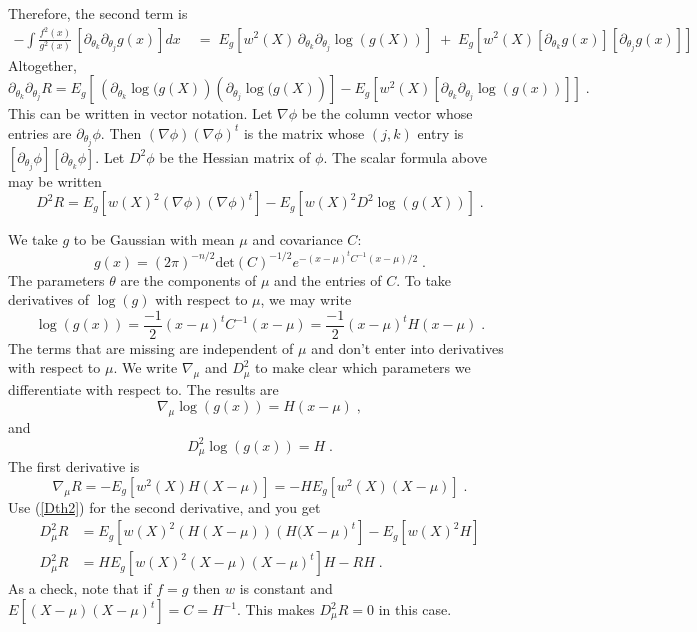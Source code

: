 \documentclass{article}
\begin{document}
Therefore, the second term is
\begin{align*}
    - \int \frac{f^2(x)}{g^2(x)} \,\left[\partial_{\theta_k}\partial_{\theta_j} g(x)\right] dx
  \;&=\;   E_g\!\left[ w^2(X)\, \partial_{\theta_k} \partial_{\theta_j}\log(g(X))\right]
   \; + \; E_g\!\left[ w^2(X)\left[ \partial_{\theta_k} g(x)\right]
                \left[ \partial_{\theta_j} g(x)\right]\right]
\end{align*}
Altogether,
\[
   \partial_{\theta_k} \partial_{\theta_j}R 
           =  E_g\!\left[ \,\left(\partial_{\theta_k} \log( g(X)\right)
                            \left(\partial_{\theta_j} \log( g(X)\right) \right]
            - E_g\!\left[ w^2(X)\left[ \partial_{\theta_k} \partial_{\theta_j}\log(g(x))\right]\right] \; .
\]
This can be written in vector notation.
Let $\nabla \phi$ be the column vector whose entries are $\partial_{\theta_j} \phi$.
Then $\left( \nabla \phi\right) \left( \nabla \phi\right)^t$ is the matrix whose $(j,k)$ entry is
$\left[\partial_{\theta_j}\phi\right] \left[\partial_{\theta_k} \phi\right] $.
Let $D^2 \phi$ be the Hessian matrix of $\phi$.
The scalar formula above may be written
\begin{equation}
D^2 R = E_g\!\left[  w(X)^2\left(\nabla \phi\right)\left( \nabla \phi\right)^t\right]
      - E_g\!\left[  w(X)^2 D^2 \log(g(X)) \right] \; .
\label{Dth2} \end{equation}

We take $g$ to be Gaussian with mean $\mu$ and covariance $C$:
\[
      g(x) = \left( 2\pi\right)^{-n/2}\mbox{det}(C)^{-1/2}e^{-(x-\mu)^tC^{-1}(x-\mu)/2} \; .
\]
The parameters $\theta$ are the components of $\mu$ and the entries of $C$.
To take derivatives of $\log(g)$ with respect to $\mu$, we may write
\[
   \log(g(x)) = \frac{-1}{2} (x-\mu)^tC^{-1}(x-\mu) 
              =  \frac{-1}{2} (x-\mu)^tH(x-\mu) \; .
\]
The terms that are missing are independent of $\mu$ and don't enter into derivatives with 
respect to $\mu$.
We write $\nabla_{\mu}$ and $D^2_{\mu}$ to make clear which parameters we differentiate with
respect to.
The results are
\[
      \nabla_{\mu}\log(g(x)) = H(x-\mu) \; ,
\]
and
\[
      D^2_{\mu} \log(g(x)) = H \; .
\]
The first derivative is
\begin{equation}
   \nabla_{\mu}R = - E_g \!\left[ w^2(X) H(X-\mu)\right]
                 = - H E_g \!\left[ w^2(X) (X-\mu)\right] \; .
\label{Dmu} \end{equation}
Use (\ref{Dth2}) for the second derivative, and you get
\begin{align}
     D^2_{\mu} R &=  E_g\!\left[  w(X)^2\left( H(X-\mu)\right)\left( H(X-\mu\right)^t\right]
      - E_g\!\left[  w(X)^2 H \right] \nonumber\\
     D^2_{\mu} R &=  HE_g\!\left[  w(X)^2(X-\mu)(X-\mu)^t\right]H
      - RH \; .
\label{Dmu2} \end{align}
As a check, note that if $f=g$ then $w$ is constant and $E\!\left[(X-\mu)(X-\mu)^t\right] = C = H^{-1}$.
This makes $D^2_{\mu} R=0$ in this case.
\end{document}

